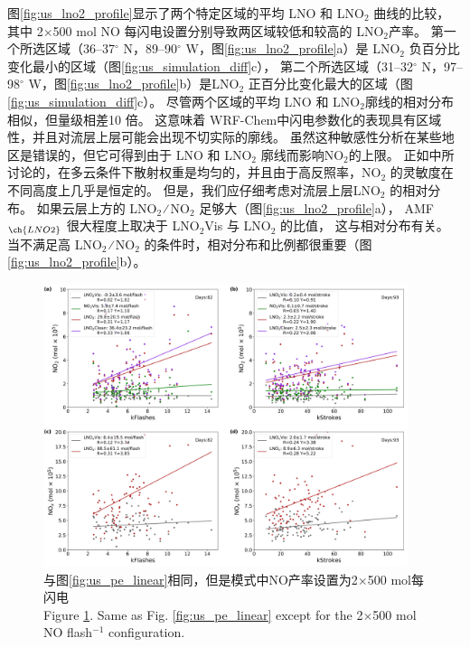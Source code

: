 图\ref{fig:us_lno2_profile}显示了两个特定区域的平均 LNO 和 LNO$_2$ 曲线的比较，
其中 2$\times$500 mol NO 每闪电设置分别导致两区域较低和较高的 LNO$_2$产率。
第一个所选区域（36--37$^{\circ}$ N，89--90$^{\circ}$ W，图\ref{fig:us_lno2_profile}a）是 LNO$_2$ 负百分比变化最小的区域（图\ref{fig:us_simulation_diff}c），
第二个所选区域（31--32$^{\circ}$ N，97--98$^{\circ}$ W，图\ref{fig:us_lno2_profile}b）是LNO$_2$ 正百分比变化最大的区域（图\ref{fig:us_simulation_diff}c）。
尽管两个区域的平均 LNO 和 LNO$_2$廓线的相对分布相似，但量级相差10 倍。
这意味着 WRF-Chem中闪电参数化的表现具有区域性，并且对流层上层可能会出现不切实际的廓线。
虽然这种敏感性分析在某些地区是错误的，但它可得到由于 LNO 和 LNO$_2$ 廓线而影响NO$_2$的上限。
正如\citet{Laughner.2017}中所讨论的，在多云条件下散射权重是均匀的，并且由于高反照率，NO$_2$ 的灵敏度在不同高度上几乎是恒定的。
但是，我们应仔细考虑对流层上层LNO$_2$ 的相对分布。
如果云层上方的 LNO$_2$ ∕ NO$_2$ 足够大（图\ref{fig:us_lno2_profile}a），
AMF$_{\ch{LNO2}}$ 很大程度上取决于 LNO$_2$Vis 与 LNO$_2$ 的比值，
这与相对分布有关。
当不满足高 LNO$_2$ ∕ NO$_2$ 的条件时，相对分布和比例都很重要（图\ref{fig:us_lno2_profile}b）。

\begin{figure}[H]
\centering
\includegraphics[width=0.95\textwidth]{./figures/us_pe_linear_2x500.png}
\caption{与图\ref{fig:us_pe_linear}相同，但是模式中NO产率设置为2$\times$500 mol每闪电 \\Figure \ref{fig:us_pe_linear_2x500}. Same as Fig. \ref{fig:us_pe_linear} except for the 2$\times$500 mol NO flash$^{-1}$ configuration.}
\label{fig:us_pe_linear_2x500}
\end{figure}

